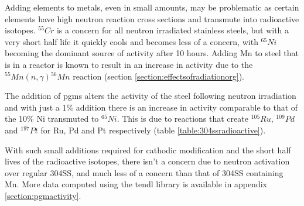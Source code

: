 Adding elements to metals, even in small amounts, may be problematic as certain elements have high neutron reaction cross sections and transmute into radioactive isotopes.  ${}^{55}Cr$ is a concern for all neutron irradiated stainless steels, but with a very short half life it quickly cools and becomes less of a concern, with ${}^{65}Ni$ becoming the dominant source of activity after 10 hours.  Adding Mn to steel that is in a reactor is known to result in an increase in activity due to the ${}^{55}Mn(n, \gamma){}^{56}Mn$ reaction (section \ref{section:effectsofradiationorg}).  

The addition of \acrshort{pgm}s alters the activity of the steel following neutron irradiation and with just a 1\% addition there is an increase in activity comparable to that of the 10\% Ni transmuted to ${}^{65}Ni$.  This is due to reactions that create ${}^{105}Ru$, 
 ${}^{109}Pd$ and ${}^{197}Pt$ for Ru, Pd and Pt respectively (table \ref{table:304ssradioactive}).  

With such small additions required for cathodic modification and the short half lives of the radioactive isotopes, there isn't a concern due to neutron activation over regular 304SS, and much less of a concern than that of 304SS containing Mn. More data computed using the \acrshort{tendl} library is available in appendix \ref{section:pgmactivity}.






